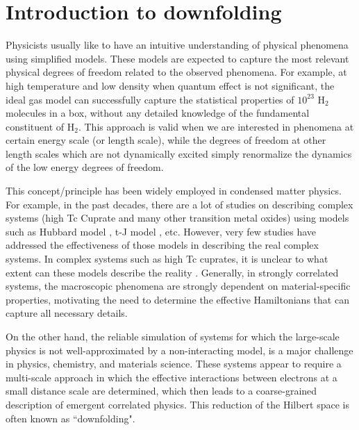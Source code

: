 \documentclass[prl,12pt,onecolumn,nofootinbib,notitlepage,english,superscriptaddress]{revtex4-1}
\newcommand{\HJC}[1]{{\color{RED}{\bf HJC: #1}}}
\begin{document}
\section{Introduction to downfolding}

\HJC{Survey of DFT based downfolding and known limitations....Survey of model Hamiltonians - Hubbard, Kanamori, .....}
\HJC{Modify intro - this is from the paper........ }

Physicists usually like to have an intuitive understanding of physical phenomena using simplified models. These models are expected to capture the most relevant physical degrees of freedom related to the observed phenomena. For example, at high temperature and low density when quantum effect is not significant, the ideal gas model can successfully capture the statistical properties of $10^{23}$ H$_{2}$ molecules in a box, without any detailed knowledge of the fundamental constituent of H$_{2}$. This approach is valid when we are interested in phenomena at certain energy scale (or length scale), while the degrees of freedom at other length scales which are not dynamically excited simply renormalize the dynamics of the low energy degrees of freedom. 

This concept/principle has been widely employed in condensed matter physics. For example, in the past decades, there are a lot of studies on describing complex systems (high Tc Cuprate and many other transition metal oxides) using models such as Hubbard model \cite{Yanagisawa2008}, t-J model \cite{Sorella2002}, etc. However, very few studies have addressed the effectiveness of those models in describing the real complex systems. In complex systems such as high Tc cuprates, it is unclear to what extent can these models describe the reality \cite{Anderson2013}. Generally, in strongly correlated systems, the macroscopic phenomena are strongly dependent on material-specific properties, motivating the need to determine the effective Hamiltonians that can capture all necessary details. 

On the other hand, the reliable simulation of systems for which the large-scale physics is not well-approximated by a non-interacting model, is a major challenge in physics, chemistry, and materials science. These systems appear to require a multi-scale approach in which the effective interactions between electrons at a small distance scale are determined, which then leads to a coarse-grained description of emergent correlated physics. This reduction of the Hilbert space is often known as ``downfolding".
\end{document}
